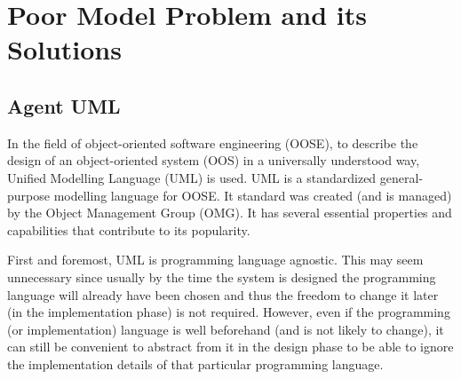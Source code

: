 
\chapter{Poor Model Problem and its Solutions}

\section{Agent UML}

In the field of object-oriented software engineering (OOSE), to describe the design of an object-oriented system (OOS) in a universally understood way, Unified Modelling Language (UML) is used.
UML is a standardized general-purpose modelling language for OOSE.
It standard was created (and is managed) by the Object Management Group (OMG).
It has several essential properties and capabilities that contribute to its popularity.

First and foremost, UML is programming language agnostic.
This may seem unnecessary since usually by the time the system is designed the programming language will already have been chosen and thus the freedom to change it later (in the implementation phase) is not required.
However, even if the programming (or implementation) language is well beforehand (and is not likely to change), it can still be convenient to abstract from it in the design phase to be able to ignore the implementation details of that particular programming language.

